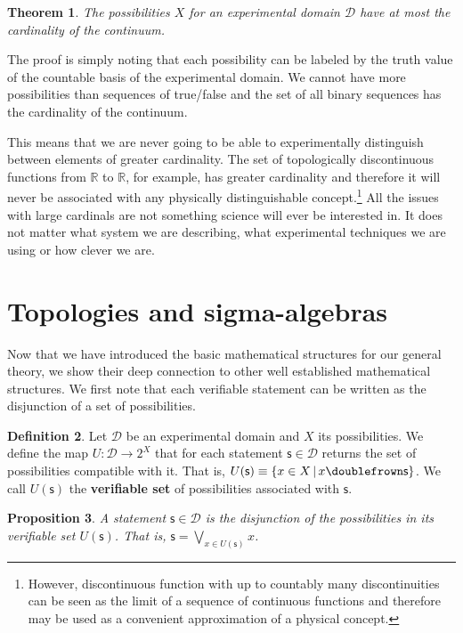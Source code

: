 \documentclass[letterpaper]{article}
\theoremstyle{plain}%
\newtheorem{thrm}{Theorem}[section]
\newtheorem{prop}[thrm]{Proposition}
\theoremstyle{definition}
\newtheorem{defn}[thrm]{Definition}
\theoremstyle{remark}
\numberwithin{equation}{section}
\def\comp{\doublefrown}
\def\bigOR{\bigvee}
\newcommand{\obs}[1][s] {\mathsf{#1}}
\newcommand{\edomain}[1][D] {\mathcal{#1}}
\begin{document}
\begin{thrm}
	The possibilities $X$ for an experimental domain $\edomain$ have at most the cardinality of the continuum.
\end{thrm}

The proof is simply noting that each possibility can be labeled by the truth value of the countable basis of the experimental domain. We cannot have more possibilities than sequences of true/false and the set of all binary sequences has the cardinality of the continuum.

This means that we are never going to be able to experimentally distinguish between elements of greater cardinality. The set of topologically discontinuous functions from $\mathbb{R}$ to $\mathbb{R}$, for example, has greater cardinality and therefore it will never be associated with any physically distinguishable concept.\footnote{However, discontinuous function with up to countably many discontinuities can be seen as the limit of a sequence of continuous functions and therefore may be used as a convenient approximation of a physical concept.} All the issues with large cardinals are not something science will ever be interested in. It does not matter what system we are describing, what experimental techniques we are using or how clever we are.

\section{Topologies and sigma-algebras}

Now that we have introduced the basic mathematical structures for our general theory, we show their deep connection to other well established mathematical structures. We first note that each verifiable statement can be written as the disjunction of a set of possibilities.

\begin{defn}
	Let $\edomain$ be an experimental domain and $X$ its possibilities. We define the map $U : \edomain \rightarrow 2^X$ that for each statement $\obs \in \edomain$ returns the set of possibilities compatible with it. That is, $U(\obs)\equiv\{ x \in X \, | \, x \comp \obs\}$. We call $U(\obs)$ the \textbf{verifiable set} of possibilities associated with $\obs$.
\end{defn}

\begin{prop}
	A statement $\obs \in \edomain$ is the disjunction of the possibilities in its verifiable set $U(\obs)$. That is, $\obs=\bigOR\limits_{x \in U(\obs)} x$.
\end{prop}
\end{document}
